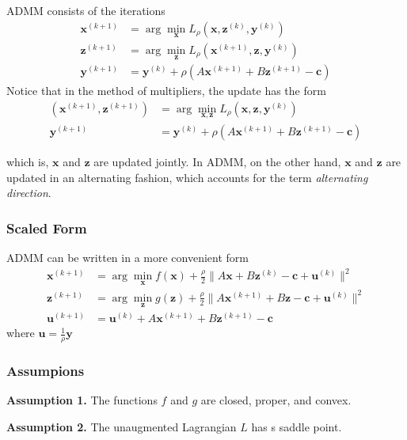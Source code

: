 ADMM consists of the iterations
\begin{align}
    \mathbf{x}^{(k+1)} &= \arg\min_\mathbf{x}
    L_\rho(\mathbf{x}, \mathbf{z}^{(k)}, \mathbf{y}^{(k)}) \\
    \mathbf{z}^{(k+1)} &= \arg\min_\mathbf{z}
    L_\rho(\mathbf{x}^{(k+1)}, \mathbf{z}, \mathbf{y}^{(k)})\\
    \mathbf{y}^{(k+1)} &= \mathbf{y}^{(k)} + 
    \rho (A\mathbf{x}^{(k+1)} + B\mathbf{z}^{(k+1)} - \mathbf{c})
\end{align}
Notice that in the method of multipliers, the update has the form
\begin{align}
    (\mathbf{x}^{(k+1)}, \mathbf{z}^{(k+1)}) &= \arg\min_{\mathbf{x}, \mathbf{z}}
    L_\rho(\mathbf{x}, \mathbf{z}, \mathbf{y}^{(k)})\\
    \mathbf{y}^{(k+1)} &= \mathbf{y}^{(k)} + 
    \rho (A\mathbf{x}^{(k+1)} + B\mathbf{z}^{(k+1)} - \mathbf{c})
\end{align}

which is, $\mathbf{x}$ and $\mathbf{z}$ are updated jointly.
In ADMM, on the other hand, $\mathbf{x}$ and $\mathbf{z}$
are updated in an alternating fashion, which accounts for the term
\emph{alternating direction}.

\subsubsection{Scaled Form}
ADMM can be written in a more convenient form
\begin{align}
    \mathbf{x}^{(k+1)} &= \arg\min_\mathbf{x}
    f(\mathbf{x}) + \frac{\rho}{2} \parallel
    A\mathbf{x} + B\mathbf{z}^{(k)} - \mathbf{c} + \mathbf{u}^{(k)}
    \parallel^2 \\
    \mathbf{z}^{(k+1)} &= \arg\min_\mathbf{z}
    g(\mathbf{z}) + \frac{\rho}{2} \parallel
    A\mathbf{x}^{(k+1)} + B\mathbf{z} - \mathbf{c} + \mathbf{u}^{(k)}
    \parallel^2 \\
    \mathbf{u}^{(k+1)} &= \mathbf{u}^{(k)} + 
    A\mathbf{x}^{(k+1)} + B\mathbf{z}^{(k+1)} - \mathbf{c}
\end{align}
where $\mathbf{u} = \frac{1}{\rho} \mathbf{y}$

\subsubsection{Assumpions}
\noindent\textbf{Assumption 1.}
The functions $f$ and $g$ are closed, proper, and convex.
\par
\noindent\textbf{Assumption 2.}
The unaugmented Lagrangian $L$ has s saddle point.



